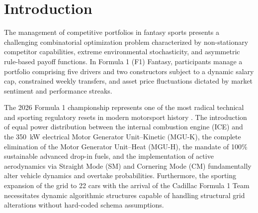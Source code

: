 \section{Introduction}
\label{sec:introduction}

The management of competitive portfolios in fantasy sports presents a challenging combinatorial optimization problem characterized by non-stationary competitor capabilities, extreme environmental stochasticity, and asymmetric rule-based payoff functions. In Formula 1 (F1) Fantasy, participants manage a portfolio comprising five drivers and two constructors subject to a dynamic salary cap, constrained weekly transfers, and asset price fluctuations dictated by market sentiment and performance streaks.

The 2026 Formula 1 championship represents one of the most radical technical and sporting regulatory resets in modern motorsport history \cite{fia2026regulations}. The introduction of equal power distribution between the internal combustion engine (ICE) and the 350~kW electrical Motor Generator Unit--Kinetic (MGU-K), the complete elimination of the Motor Generator Unit--Heat (MGU-H), the mandate of 100\% sustainable advanced drop-in fuels, and the implementation of active aerodynamics via Straight Mode (SM) and Cornering Mode (CM) fundamentally alter vehicle dynamics and overtake probabilities. Furthermore, the sporting expansion of the grid to 22 cars with the arrival of the Cadillac Formula 1 Team necessitates dynamic algorithmic structures capable of handling structural grid alterations without hard-coded schema assumptions.

